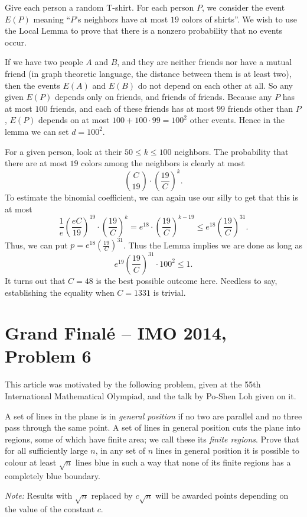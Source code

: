 \documentclass[11pt]{scrartcl}
\begin{document}
\begin{soln}
	Give each person a random T-shirt.
	For each person $P$, we consider the event $E(P)$ meaning ``$P$'s neighbors have at most $19$ colors of shirts''.
	We wish to use the Local Lemma to prove that there is a nonzero probability that no events occur.

	If we have two people $A$ and $B$, and they are neither friends nor have a mutual friend (in graph theoretic language,
	the distance between them is at least two), then the events $E(A)$ and $E(B)$ do not depend on each other at all.
	So any given $E(P)$ depends only on friends, and friends of friends.
	Because any $P$ has at most $100$ friends, and each of these friends has at most $99$ friends other than $P$,
	$E(P)$ depends on at most $100 + 100 \cdot 99 = 100^2$ other events.
	Hence in the lemma we can set $d = 100^2$.

	For a given person, look at their $50 \le k \le 100$ neighbors.
	The probability that there are at most $19$ colors among the neighbors is clearly at most
	\[ \binom{C}{19} \cdot \left( \frac{19}{C} \right)^k. \]
	To estimate the binomial coefficient, we can again use our silly  to get that this is at most
	\[ \frac 1e \left( \frac{eC}{19} \right)^{19}
		\cdot \left( \frac{19}{C} \right)^k
		= e^{18} \cdot \left( \frac{19}{C} \right)^{k-19}
		\le e^{18} \left( \frac{19}{C} \right)^{31}. \]
	Thus, we can put $p = e^{18} \left( \frac{19}{C} \right)^{31}$.
	Thus the Lemma implies we are done as long as
	\[ e^{19} \left( \frac{19}{C} \right)^{31} \cdot 100^2 \le 1. \]
	It turns out that $C=48$ is the best possible outcome here.
	Needless to say, establishing the equality when $C = 1331$ is trivial.
\end{soln}





\section{Grand Final\'e -- IMO 2014, Problem 6}
This article was motivated by the following problem,
given at the 55th International Mathematical Olympiad,
and the talk by Po-Shen Loh \cite{potalk} given on it.
\begin{example}
	[IMO 2014/6]
	A set of lines in the plane is in \emph{general position} if no two are parallel and no three pass through the same point.
	A set of lines in general position cuts the plane into regions, some of which have finite area; we call these its \emph{finite regions}.
	Prove that for all sufficiently large $n$,
	in any set of $n$ lines in general position it is possible to colour at least $\sqrt{n}$ lines blue
	in such a way that none of its finite regions has a completely blue boundary.

	\emph{Note:} Results with $\sqrt{n}$ replaced by $c\sqrt{n}$ will be awarded points depending on the value of the constant $c$.
\end{example}
\end{document}
